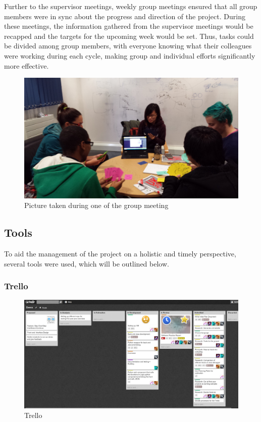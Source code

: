 \documentclass[11pt, a4paper]{article}
\begin{document}
Further to the supervisor meetings, weekly group meetings ensured that all group members were in sync about the progress and direction of the project.
During these meetings, the information gathered from the supervisor meetings would be recapped and the targets for the upcoming week would be set.
Thus, tasks could be divided among group members, with everyone knowing what their colleagues were working during each cycle, making group and individual efforts significantly more effective.
\begin{figure}[h!]
\centering
\includegraphics[width=130mm]{estimation.jpg}
\caption{Picture taken during one of the group meeting}
\end{figure}

\subsection{Tools}

To aid the management of the project on a holistic and timely perspective, several tools were used, which will be outlined below.

\subsubsection{Trello}
\begin{figure}[h!]
\centering
\includegraphics[width=\textwidth]{Trello.png}
\caption{Trello}
\label{fig:Trello}
\end{figure}
\end{document}

